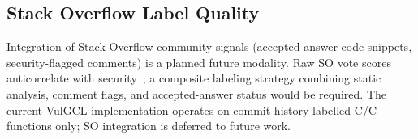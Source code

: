 \subsection{Stack Overflow Label Quality}

Integration of Stack Overflow community signals (accepted-answer code snippets,
security-flagged comments) is a planned future modality. Raw SO vote scores
anticorrelate with security~\cite{chen2019reliable}; a composite labeling strategy
combining static analysis, comment flags, and accepted-answer status would be
required. The current VulGCL implementation operates on commit-history-labelled C/C++ functions
only; SO integration is deferred to future work.
